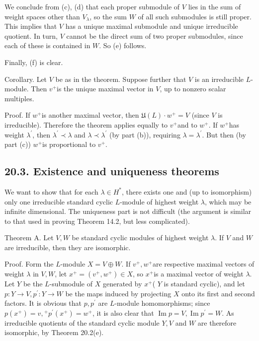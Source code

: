 \documentclass[10pt]{article}
\begin{document}
We conclude from (c), (d) that each proper submodule of $V$ lies in the sum of weight spaces other than $V_{\lambda}$, so the sum $W$ of all such submodules is still proper. This implies that $V$ has a unique maximal submodule and unique irreducible quotient. In turn, $V$ cannot be the direct sum of two proper submodules, since each of these is contained in $W$. So (e) follows.

Finally, (f) is clear.

Corollary. Let $V$ be as in the theorem. Suppose further that $V$ is an irreducible $L$-module. Then $v^{+}$is the unique maximal vector in $V$, up to nonzero scalar multiples.

Proof. If $w^{+}$is another maximal vector, then $\mathfrak{U}(L) \cdot w^{+}=V$ (since $V$ is irreducible). Therefore the theorem applies equally to $v^{+}$and to $w^{+}$. If $w^{+}$has weight $\lambda^{\prime}$, then $\lambda^{\prime} \prec \lambda$ and $\lambda \prec \lambda^{\prime}$ (by part (b)), requiring $\lambda=\lambda^{\prime}$. But then (by part (c)) $w^{+}$is proportional to $v^{+}$.

\subsection*{20.3. Existence and uniqueness theorems}
We want to show that for each $\lambda \in H^{*}$, there exists one and (up to isomorphism) only one irreducible standard cyclic $L$-module of highest weight $\lambda$, which may be infinite dimensional. The uniqueness part is not difficult (the argument is similar to that used in proving Theorem 14.2, but less complicated).

Theorem A. Let $V, W$ be standard cyclic modules of highest weight $\lambda$. If $V$ and $W$ are irreducible, then they are isomorphic.

Proof. Form the $L$-module $X=V \oplus W$. If $v^{+}, w^{+}$are respective maximal vectors of weight $\lambda$ in $V, W$, let $x^{+}=\left(v^{+}, w^{+}\right) \in X$, so $x^{+}$is a maximal vector of weight $\lambda$. Let $Y$ be the $L$-submodule of $X$ generated by $x^{+}$( $Y$ is standard cyclic), and let $p: Y \rightarrow V, p^{\prime}: Y \rightarrow W$ be the maps induced by projecting $X$ onto its first and second factors. It is obvious that $p, p^{\prime}$ are $L$-module homomorphisms; since $p\left(x^{+}\right)=v,{ }^{+} p^{\prime}\left(x^{+}\right)=w^{+}$, it is also clear that $\operatorname{Im} p=V, \operatorname{Im} p^{\prime}=W$. As irreducible quotients of the standard cyclic module $Y, V$ and $W$ are therefore isomorphic, by Theorem 20.2(e).
\end{document}
